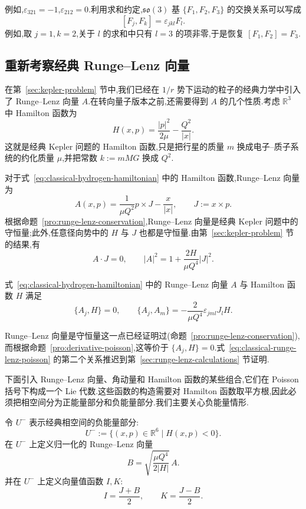 {例如,$\varepsilon_{321}=-1$,$\varepsilon_{212}=0$.利用求和约定,$\mathfrak{so}(3)$ 基 $\{F_1,F_2,F_3\}$ 的交换关系可以写成
\[
 [F_j,F_k]=\varepsilon_{jkl}F_l.
\label{eq:so3-epsilon-commutator}
\]
例如,取 $j=1,k=2$,关于 $l$ 的求和中只有 $l=3$ 的项非零,于是恢复 $[F_1,F_2]=F_3$.

\subsection{重新考察经典 Runge--Lenz 向量}
\label{subsec:classical-runge-lenz-revisited}

在第~\ref{sec:kepler-problem} 节中,我们已经在 $1/r$ 势下运动的粒子的经典力学中引入了 Runge--Lenz 向量 $A$.在转向量子版本之前,还需要得到 $A$ 的几个性质.考虑 $\mathbb R^3$ 中 Hamilton 函数为
\[
 H(x,p)=\frac{|p|^2}{2\mu}-\frac{Q^2}{|x|}.
\label{eq:classical-hydrogen-hamiltonian}
\]
这就是经典 Kepler 问题的 Hamilton 函数,只是把行星的质量 $m$ 换成电子--质子系统的约化质量 $\mu$,并把常数 $k:=mMG$ 换成 $Q^2$.

对于式~\eqref{eq:classical-hydrogen-hamiltonian} 中的 Hamilton 函数,Runge--Lenz 向量为
\[
 A(x,p)=\frac1{\mu Q^2}p\times J-\frac{x}{|x|},
 \qquad J:=x\times p.
\label{eq:classical-runge-lenz-vector}
\]
根据命题~\ref{pro:runge-lenz-conservation},Runge--Lenz 向量是经典 Kepler 问题中的守恒量;此外,任意径向势中的 $H$ 与 $J$ 也都是守恒量.由第~\ref{sec:kepler-problem} 节的结果,有
\[
 A\cdot J=0,
\qquad
 |A|^2=1+\frac{2H}{\mu Q^4}|J|^2.
\label{eq:classical-runge-lenz-algebraic-relations}
\]

\begin{lemma}\label{lem:classical-runge-lenz-poisson}
式~\eqref{eq:classical-hydrogen-hamiltonian} 中的 Runge--Lenz 向量 $A$ 与 Hamilton 函数 $H$ 满足
\[
 \{A_j,H\}=0,
 \qquad
 \{A_j,A_m\}=-\frac2{\mu Q^4}\varepsilon_{jml}J_lH.
\label{eq:classical-runge-lenz-poisson}
\]
\end{lemma}

Runge--Lenz 向量是守恒量这一点已经证明过(命题~\ref{pro:runge-lenz-conservation}),而根据命题~\ref{pro:derivative-poisson},这等价于 $\{A_j,H\}=0$.式~\eqref{eq:classical-runge-lenz-poisson} 的第二个关系推迟到第~\ref{sec:runge-lenz-calculations} 节证明.

下面引入 Runge--Lenz 向量、角动量和 Hamilton 函数的某些组合,它们在 Poisson 括号下构成一个 Lie 代数.这些函数的构造需要对 Hamilton 函数取平方根,因此必须把相空间分为正能量部分和负能量部分.我们主要关心负能量情形.

\begin{definition}\label{def:classical-normalized-runge-lenz}
令 $U^-$ 表示经典相空间的负能量部分:
\[
 U^-:=\{(x,p)\in\mathbb R^6\mid H(x,p)<0\}.
\]
在 $U^-$ 上定义归一化的 Runge--Lenz 向量
\[
 B=\sqrt{\frac{\mu Q^4}{2|H|}}\,A.
\]
并在 $U^-$ 上定义向量值函数 $I,K$:
\[
 I=\frac{J+B}{2},
 \qquad
 K=\frac{J-B}{2}.
\]
\end{definition}

}

